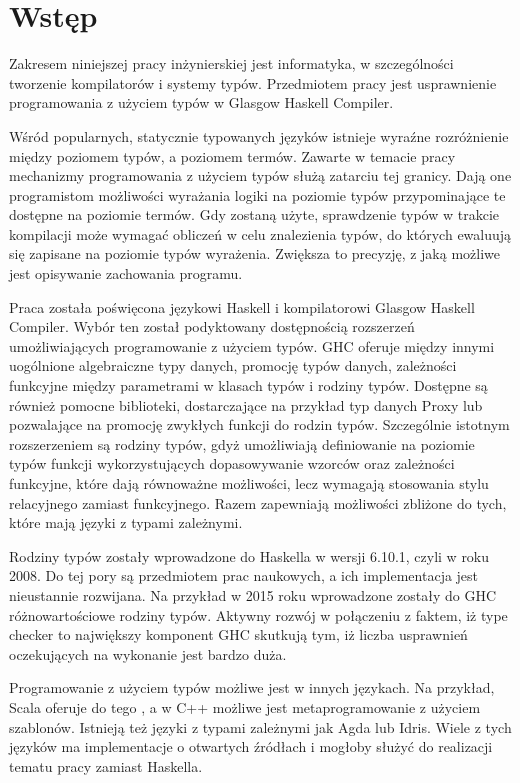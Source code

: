 \chapter{Wstęp}\label{chap:wstep}

Zakresem niniejszej pracy inżynierskiej jest informatyka, w szczególności
tworzenie kompilatorów i systemy typów. Przedmiotem pracy jest usprawnienie
programowania z użyciem typów w Glasgow Haskell Compiler.

Wśród popularnych, statycznie typowanych języków istnieje wyraźne rozróżnienie
między poziomem typów, a poziomem termów. Zawarte w temacie pracy mechanizmy
programowania z użyciem typów służą zatarciu tej granicy. Dają one programistom
możliwości wyrażania logiki na poziomie typów przypominające te dostępne na
poziomie termów. Gdy zostaną użyte, sprawdzenie typów w trakcie kompilacji może
wymagać obliczeń w celu znalezienia typów, do których ewaluują się zapisane na
poziomie typów wyrażenia. Zwiększa to precyzję, z jaką możliwe jest opisywanie
zachowania programu.

Praca została poświęcona językowi Haskell i kompilatorowi Glasgow Haskell
Compiler. Wybór ten został podyktowany dostępnością rozszerzeń umożliwiających
programowanie z użyciem typów. GHC oferuje między innymi uogólnione algebraiczne
typy danych, promocję typów danych, zależności funkcyjne między parametrami w
klasach typów i rodziny typów. Dostępne są również pomocne biblioteki,
dostarczające na przykład typ danych Proxy lub pozwalające na promocję zwykłych
funkcji do rodzin typów. Szczególnie istotnym rozszerzeniem są rodziny typów,
gdyż umożliwiają definiowanie na poziomie typów funkcji wykorzystujących
dopasowywanie wzorców oraz zależności funkcyjne, które dają równoważne
możliwości, lecz wymagają stosowania stylu relacyjnego zamiast
funkcyjnego. Razem zapewniają możliwości zbliżone do tych, które mają języki z
typami zależnymi.

Rodziny typów zostały wprowadzone do Haskella w wersji 6.10.1, czyli w roku
2008. Do tej pory są przedmiotem prac naukowych, a ich implementacja jest
nieustannie rozwijana. Na przykład w 2015 roku wprowadzone zostały do GHC
różnowartościowe rodziny typów. Aktywny rozwój w połączeniu z faktem, iż type
checker to największy komponent GHC\cite{AOSA} skutkują tym, iż liczba
usprawnień oczekujących na wykonanie jest bardzo duża.

Programowanie z użyciem typów możliwe jest w innych językach. Na przykład, Scala
oferuje do tego , a w C++ możliwe jest
metaprogramowanie z użyciem szablonów. Istnieją też języki z typami zależnymi
jak Agda lub Idris. Wiele z tych języków ma implementacje o otwartych źródłach i
mogłoby służyć do realizacji tematu pracy zamiast Haskella.

